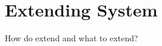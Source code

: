 \section{Extending \jel{} System}
\label{sec:Extending_Jeliot_System}

How do extend and what to extend?